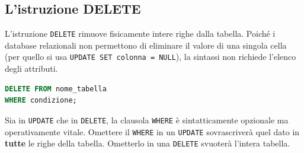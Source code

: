 \subsection{L'istruzione DELETE}

L'istruzione \texttt{DELETE} rimuove fisicamente intere righe dalla tabella. Poiché i database relazionali non permettono di eliminare il valore di una singola cella (per quello si usa \texttt{UPDATE SET colonna = NULL}), la sintassi non richiede l'elenco degli attributi.

\begin{lstlisting}[language=SQL, basicstyle=\ttfamily\small, keywordstyle=\color{blue}\bfseries]
DELETE FROM nome_tabella
WHERE condizione;
\end{lstlisting}

\begin{warningbox}
Sia in \texttt{UPDATE} che in \texttt{DELETE}, la clausola \texttt{WHERE} è sintatticamente opzionale ma operativamente vitale. Omettere il \texttt{WHERE} in un \texttt{UPDATE} sovrascriverà quel dato in \textbf{tutte} le righe della tabella. Ometterlo in una \texttt{DELETE} svuoterà l'intera tabella.
\end{warningbox}

